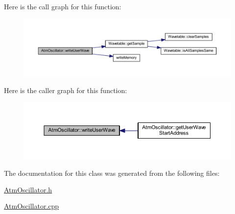 Here is the call graph for this function\+:
\nopagebreak
\begin{figure}[H]
\begin{center}
\leavevmode
\includegraphics[width=350pt]{class_atm_oscillator_a92133ff9c3b34a6acb703f0d6d95cd71_cgraph}
\end{center}
\end{figure}
Here is the caller graph for this function\+:
\nopagebreak
\begin{figure}[H]
\begin{center}
\leavevmode
\includegraphics[width=350pt]{class_atm_oscillator_a92133ff9c3b34a6acb703f0d6d95cd71_icgraph}
\end{center}
\end{figure}


The documentation for this class was generated from the following files\+:\begin{DoxyCompactItemize}
\item 
\hyperlink{_atm_oscillator_8h}{Atm\+Oscillator.\+h}\item 
\hyperlink{_atm_oscillator_8cpp}{Atm\+Oscillator.\+cpp}\end{DoxyCompactItemize}
